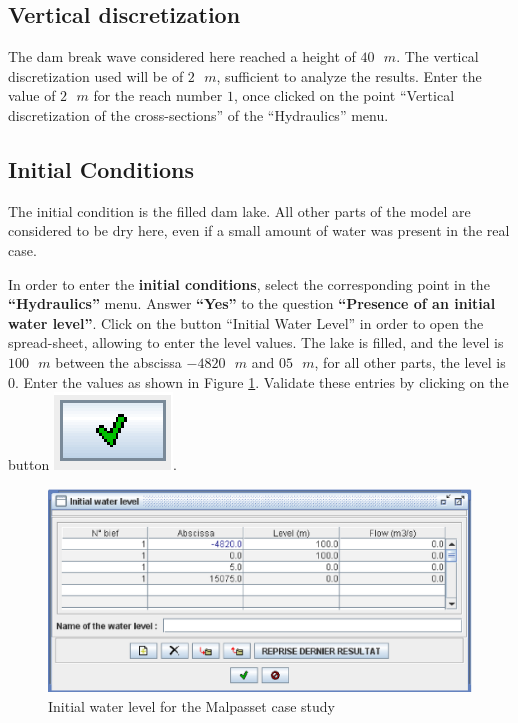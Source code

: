 \documentclass[a4paper,12pt]{article}
\begin{document}
\subsection{Vertical discretization}

\hspace{0.5cm}The dam break wave considered here reached a height of $40\mbox{ }m$. The vertical
discretization used will be of $2\mbox{ }m$, sufficient to analyze the results.
Enter the value of $2\mbox{ }m$ for the reach number $1$, once clicked on the
point {}``Vertical discretization of the cross-sections'' of the
{}``Hydraulics'' menu.


\subsection{Initial Conditions 
}

\hspace{0.5cm}The initial condition is the filled dam lake. All other parts of the
model are considered to be dry here, even if a small amount of water
was present in the real case. 

\vspace{0.5cm}

In order to enter the \textbf{initial conditions}, select the corresponding
point in the \textbf{{}``Hydraulics''} menu. Answer \textbf{{}``Yes''}
to the question \textbf{{}``Presence of an initial water level''}.
Click on the button {}``Initial Water Level'' in order to open the
spread-sheet, allowing to enter the level values. The lake is
filled, and the level is $100\mbox{ }m$ between the abscissa $-4820\mbox{ }m$ and $05\mbox{ }m$, for
all other parts, the level is $0$. Enter the values as shown in 
Figure \ref{fig:Initial-water-level}. Validate these entries by clicking
on the button \includegraphics[scale=0.6]{valid}.

\begin{figure}[h]
  \begin{center}
  \includegraphics[scale=0.6]{initial_wl}
  \caption{Initial water level for the Malpasset case study}
  \label{fig:Initial-water-level}
  \end{center}
\end{figure}
\end{document}
